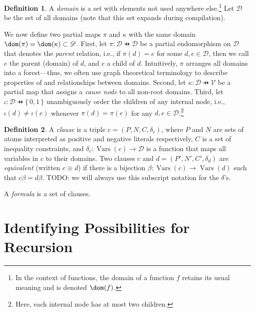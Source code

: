 \documentclass{article}
\theoremstyle{definition}
\newtheorem{definition}{Definition}
\DeclareMathOperator{\Vars}{Vars}
\begin{document}
\begin{definition}
  A \emph{domain} is a set with elements not used anywhere else.\footnote{In the context of functions, the domain of a function $f$ retains its usual meaning and is denoted $\dom(f)$.} Let $\mathscr{D}$ be the set of all domains (note that this set expands during compilation).

  We now define two partial maps $\pi$ and $\kappa$ with the same domain $\dom(\pi) = \dom(\kappa) \subset \mathscr{D}$. First, let $\pi\colon \mathscr{D} \pfun \mathscr{D}$ be a partial endomorphism on $\mathscr{D}$ that denotes the \emph{parent} relation, i.e., if $\pi(d) = e$ for some $d, e \in \mathscr{D}$, then we call $e$ the parent (domain) of $d$, and $e$ a child of $d$. Intuitively, $\pi$ arranges all domains into a forest---thus, we often use graph theoretical terminology to describe properties of and relationships between domains. Second, let $\kappa\colon \mathscr{D} \pfun \mathscr{V}$ be a partial map that assigns a \emph{cause node} to all non-root domains. Third, let $\iota\colon \mathscr{D} \pfun \{\, 0, 1 \,\}$ unambiguously order the children of any internal node, i.e., $\iota(d) \ne \iota(e)$ whenever $\pi(d) = \pi(e)$ for any $d, e \in \mathscr{D}$.\footnote{Here, each internal node has at most two children.}
\end{definition}

\begin{definition}
  A \emph{clause} is a triple $c = (P, N, C, \delta_c)$, where $P$ and $N$ are sets of atoms interpreted as positive and negative literals respectively, $C$ is a set of inequality constraints, and $\delta_c\colon \Vars(c) \to \mathscr{D}$ is a function that maps all variables in $c$ to their domains. Two clauses $c$ and $d = (P', N', C', \delta_d)$ are \emph{equivalent} (written $c \equiv d$) if there is a bijection $\beta\colon \Vars(c) \to \Vars(d)$ such that $c\beta = d\beta$. TODO: we will always use this subscript notation for the $\delta$'s.
\end{definition}

A \emph{formula} is a set of clauses.

\section{Identifying Possibilities for Recursion}

\end{document}
